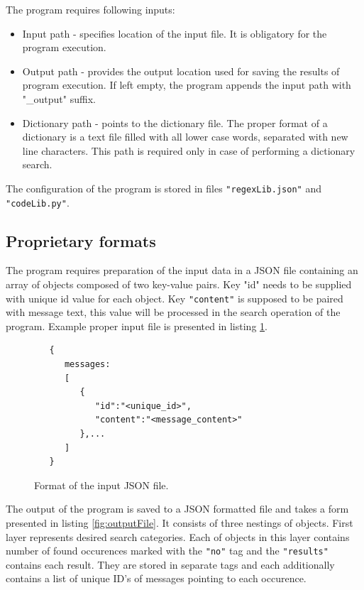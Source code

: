 \documentclass[a4paper,twoside,12pt]{book}
\begin{document}
The program requires following inputs:

\begin{itemize}
   \item Input path - specifies location of the input file. It is obligatory for the program execution.
   \item Output path - provides the output location used for saving the results of program execution. 
   If left empty, the program appends the input path with "\_output" suffix. 
   \item Dictionary path - points to the dictionary file. The proper format of a dictionary
   is a text file filled with all lower case words, separated with new line characters. This path is required
   only in case of performing a dictionary search.
\end{itemize}

The configuration of the program is stored in files \lstinline|"regexLib.json"| and \lstinline|"codeLib.py"|.

\subsection{Proprietary formats}

The program requires preparation of the input data in a JSON file containing
an array of objects composed of two key-value pairs. Key "id" needs to be 
supplied with unique id value for each object. Key \lstinline|"content"| is supposed to be 
paired with message text, this value will be processed in the search operation 
of the program. Example proper input file is presented in listing \ref{fig:inputFormat}.

\begin{figure}
   \centering
   \begin{lstlisting}
   {
      messages:
      [
         {
            "id":"<unique_id>",
            "content":"<message_content>"
         },...
      ]
   }
   \end{lstlisting}
   \caption{Format of the input JSON file.}
   \label{fig:inputFormat}
\end{figure}

The output of the program is saved to a JSON formatted file and takes a form presented in listing \ref{fig:outputFile}. 
It consists of three nestings of objects. First layer represents desired search categories. Each of objects in
this layer contains number of found occurences marked with the \lstinline|"no"| tag and the \lstinline|"results"| contains each
result. They are stored in separate tags and each additionally contains a list of unique ID's of messages 
pointing to each occurence.  
\end{document}
